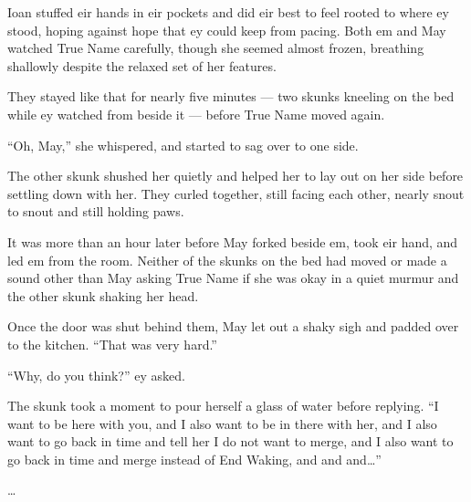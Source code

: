 Ioan stuffed eir hands in eir pockets and did eir best to feel rooted to where ey stood, hoping against hope that ey could keep from pacing. Both em and May watched True Name carefully, though she seemed almost frozen, breathing shallowly despite the relaxed set of her features.

They stayed like that for nearly five minutes — two skunks kneeling on the bed while ey watched from beside it — before True Name moved again.

``Oh, May,'' she whispered, and started to sag over to one side.

The other skunk shushed her quietly and helped her to lay out on her side before settling down with her. They curled together, still facing each other, nearly snout to snout and still holding paws.

It was more than an hour later before May forked beside em, took eir hand, and led em from the room. Neither of the skunks on the bed had moved or made a sound other than May asking True Name if she was okay in a quiet murmur and the other skunk shaking her head.

Once the door was shut behind them, May let out a shaky sigh and padded over to the kitchen. ``That was very hard.''

``Why, do you think?'' ey asked.

The skunk took a moment to pour herself a glass of water before replying. ``I want to be here with you, and I also want to be in there with her, and I also want to go back in time and tell her I do not want to merge, and I also want to go back in time and merge instead of End Waking, and and and\ldots{}''

\ldots{}
